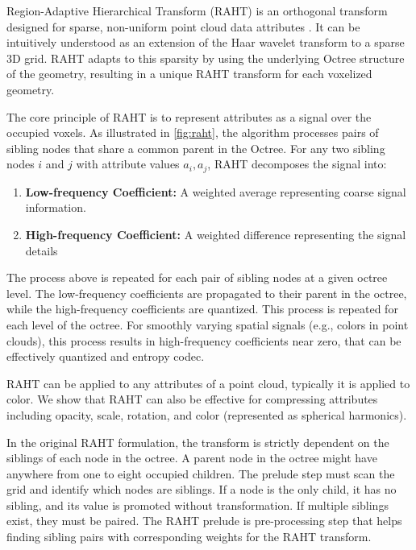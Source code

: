%
Region-Adaptive Hierarchical Transform (RAHT) is an orthogonal transform designed for sparse, non-uniform point cloud data attributes \cite{de2016compression}.
%
It can be intuitively understood as an extension of the  Haar wavelet transform to a sparse 3D grid.
%
%
RAHT adapts to this sparsity by using the underlying Octree structure of the geometry, resulting in a unique RAHT transform for each voxelized geometry.  

The core principle of RAHT is to represent attributes as a signal over the occupied voxels.
%
As illustrated in \cref{fig:raht}, the algorithm processes pairs of sibling nodes that share a common parent in the Octree.
%
For any two sibling nodes $i$ and $j$ with attribute values $a_i, a_j$, RAHT decomposes the signal into: 
\begin{enumerate}
    \item \textbf{Low-frequency Coefficient:} A weighted average representing coarse signal information. 
    \item \textbf{High-frequency Coefficient:} A weighted difference representing the signal details
\end{enumerate}

The process above is repeated for each pair of sibling nodes at a given octree level. 
The low-frequency coefficients are propagated to their parent in the octree, while the high-frequency coefficients are quantized. This process is repeated for each level of the octree.
For smoothly varying spatial signals (e.g., colors in point clouds), this process results in high-frequency coefficients near zero, that can be effectively quantized and entropy codec. 

%

RAHT can be applied to any attributes of a point cloud, typically it is applied to color. 
%
We show that RAHT can also be effective for compressing \gs attributes including opacity, scale, rotation, and color (represented as spherical harmonics).
%

%
In the original RAHT formulation, the transform is strictly dependent on the siblings of each node in the octree.
%
A parent node in the octree might have anywhere from one to eight occupied children.
%
The prelude step must scan the grid and identify which nodes are siblings.
%
If a node is the only child, it has no sibling, and its value is promoted without transformation.
%
If multiple siblings exist, they must be paired.
%
The RAHT prelude is pre-processing step that helps finding sibling pairs with corresponding weights for the RAHT transform.

